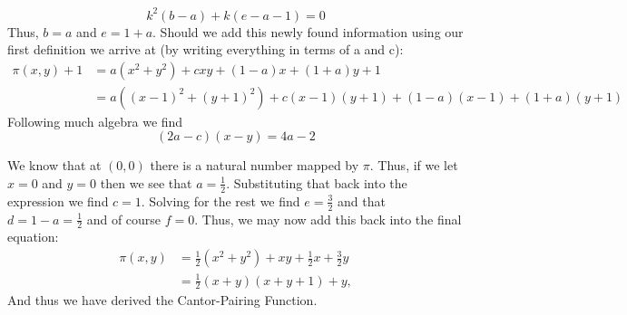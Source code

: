 \documentclass{article}
\begin{document}
\[
k^2(b-a)+k(e-a-1)=0
\] 
Thus, $b=a$ and $e=1+a$. Should we add this newly found information using our first definition we arrive at (by writing everything in terms of a and c):
\[
{\begin{aligned}\pi (x,y)+1&=a(x^{2}+y^{2})+cxy+(1-a)x+(1+a)y+1\\&=a((x-1)^{2}+(y+1)^{2})+c(x-1)(y+1)+(1-a)(x-1)+(1+a)(y+1)\end{aligned}}
\]
Following much algebra we find
\[
(2a-c)(x-y)=4a-2
\]
\par We know that at $(0,0)$ there is a natural number mapped by $\pi$. Thus, if we let $x=0$ and $y=0$ then we see that $a=\frac{1}{2}$. Substituting that back into the expression we find $c=1$. Solving for the rest we find $e=\frac{3}{2}$ and that $d=1-a=\frac{1}{2}$ and of course $f=0$. Thus, we may now add this back into the final equation:
\[
{\begin{aligned}\pi (x,y)&={\frac {1}{2}}(x^{2}+y^{2})+xy+{\frac {1}{2}}x+{\frac {3}{2}}y\\&={\frac {1}{2}}(x+y)(x+y+1)+y,\end{aligned}}
\]
And thus we have derived the Cantor-Pairing Function.
\end{document}
